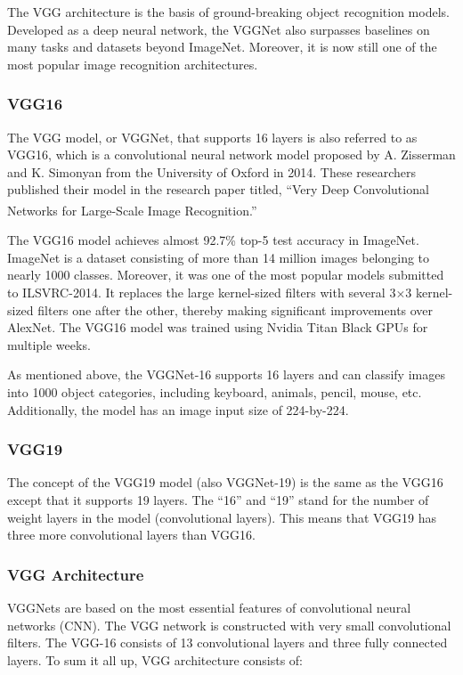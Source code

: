 The VGG architecture is the basis of ground-breaking object recognition models. Developed as a deep neural network, the VGGNet also surpasses baselines on many tasks and datasets beyond ImageNet. Moreover, it is now still one of the most popular image recognition architectures. 

\subsubsection{VGG16}
\hspace{\parindent}
The VGG model, or VGGNet, that supports 16 layers is also referred to as VGG16, which is a convolutional neural network model proposed by A. Zisserman and K. Simonyan from the University of Oxford in 2014. These researchers published their model in the research paper titled, “Very Deep Convolutional Networks for Large-Scale Image Recognition.” \textsuperscript{\cite{simonyan2014very}} 

The VGG16 model achieves almost 92.7\% top-5 test accuracy in ImageNet. ImageNet is a dataset consisting of more than 14 million images belonging to nearly 1000 classes. Moreover, it was one of the most popular models submitted to ILSVRC-2014. It replaces the large kernel-sized filters with several 3×3 kernel-sized filters one after the other, thereby making significant improvements over AlexNet. The VGG16 model was trained using Nvidia Titan Black GPUs for multiple weeks.

As mentioned above, the VGGNet-16 supports 16 layers and can classify images into 1000 object categories, including keyboard, animals, pencil, mouse, etc. Additionally, the model has an image input size of 224-by-224.

\subsubsection{VGG19}
\hspace{\parindent}
The concept of the VGG19 model (also VGGNet-19) is the same as the VGG16 except that it supports 19 layers. The “16” and “19” stand for the number of weight layers in the model (convolutional layers). This means that VGG19 has three more convolutional layers than VGG16. 

\subsubsection{VGG Architecture}
\hspace{\parindent}
VGGNets are based on the most essential features of convolutional neural networks (CNN).
The VGG network is constructed with very small convolutional filters. The VGG-16 consists of 13 convolutional layers and three fully connected layers.
To sum it all up, VGG architecture consists of:

